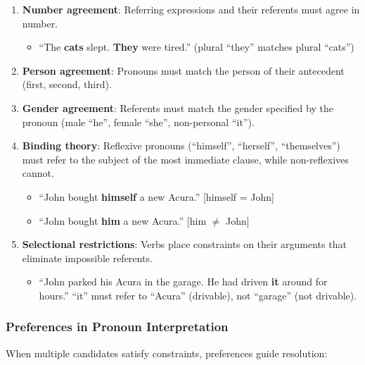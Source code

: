 \documentclass[11pt,a4paper]{article}
\begin{document}
\begin{enumerate}
    \item \textbf{Number agreement}: Referring expressions and their referents must agree in number.
    \begin{itemize}
        \item ``The \textbf{cats} slept. \textbf{They} were tired.'' (plural ``they'' matches plural ``cats'')
    \end{itemize}
    
    \item \textbf{Person agreement}: Pronouns must match the person of their antecedent (first, second, third).
    
    \item \textbf{Gender agreement}: Referents must match the gender specified by the pronoun (male ``he'', female ``she'', non-personal ``it'').
    
    \item \textbf{Binding theory}: Reflexive pronouns (``himself'', ``herself'', ``themselves'') must refer to the subject of the most immediate clause, while non-reflexives cannot.
    \begin{itemize}
        \item ``John bought \textbf{himself} a new Acura.'' [himself = John]
        \item ``John bought \textbf{him} a new Acura.'' [him $\neq$ John]
    \end{itemize}
    
    \item \textbf{Selectional restrictions}: Verbs place constraints on their arguments that eliminate impossible referents.
    \begin{itemize}
        \item ``John parked his Acura in the garage. He had driven \textbf{it} around for hours.'' ``it'' must refer to ``Acura'' (drivable), not ``garage'' (not drivable).
    \end{itemize}
\end{enumerate}

\subsubsection{Preferences in Pronoun Interpretation}

When multiple candidates satisfy constraints, preferences guide resolution:
\end{document}
